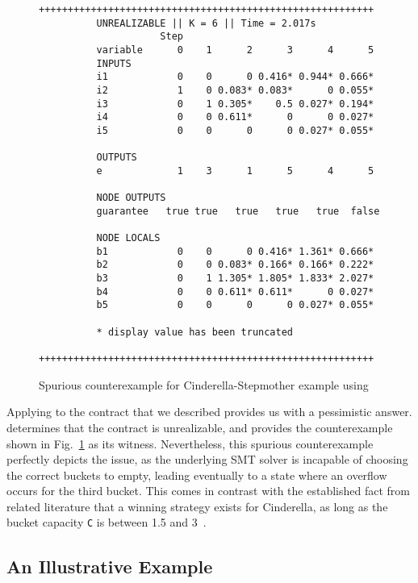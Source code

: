 \begin{figure}[!t]
\centering
 \begin{Verbatim}[fontsize=\scriptsize]
	 ++++++++++++++++++++++++++++++++++++++++++++++++++++++++++
	      UNREALIZABLE || K = 6 || Time = 2.017s
	                 Step
	      variable      0    1      2      3      4      5
	      INPUTS
	      i1            0    0      0 0.416* 0.944* 0.666*
	      i2            1    0 0.083* 0.083*      0 0.055*
	      i3            0    1 0.305*    0.5 0.027* 0.194*
	      i4            0    0 0.611*      0      0 0.027*
	      i5            0    0      0      0 0.027* 0.055*
	
	      OUTPUTS
	      e             1    3      1      5      4      5
	
	      NODE OUTPUTS
	      guarantee   true true   true   true   true  false
	
	      NODE LOCALS
	      b1            0    0      0 0.416* 1.361* 0.666*
	      b2            0    0 0.083* 0.166* 0.166* 0.222*
	      b3            0    1 1.305* 1.805* 1.833* 2.027*
	      b4            0    0 0.611* 0.611*      0 0.027*
	      b5            0    0      0      0 0.027* 0.055*
	
	      * display value has been truncated
	 ++++++++++++++++++++++++++++++++++++++++++++++++++++++++++
 \end{Verbatim}
\vspace{-1.5em}
\caption{Spurious counterexample for Cinderella-Stepmother example using \jsyn}
\label{fg:cex}
\end{figure}

Applying \jsyn to the contract that we described provides us with a pessimistic answer. \jsyn determines that the contract is unrealizable, and provides the counterexample shown in Fig.~\ref{fg:cex} as its witness. Nevertheless, this spurious counterexample perfectly depicts the issue, as the underlying SMT solver is incapable of choosing the correct
buckets to empty, leading eventually to a state where an overflow occurs for the third bucket. This comes in contrast with the established fact from related literature that a winning strategy exists for Cinderella, as long as the bucket capacity \texttt{C} is between 1.5 and 3~\cite{bodlaender2012cinderella}.

\iffalse
\subsection{An Illustrative Example}

